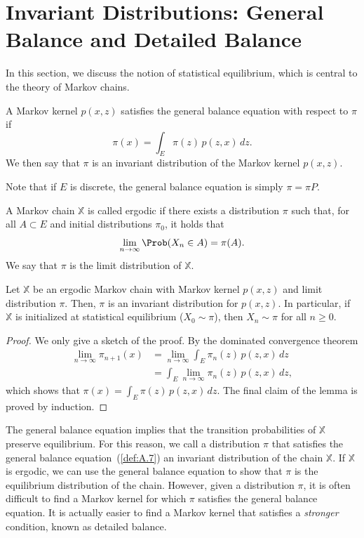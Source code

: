 \section{Invariant Distributions: General Balance and Detailed Balance}
\label{sec:A.2}

In this section, we discuss the notion of statistical equilibrium, which is central to the theory of
Markov chains.

\begin{definition}
\label{def:A.7}
A Markov kernel $p(x, z)$ satisfies the general balance equation with respect to $\pi$ if
\[
  \pi(x) = \int_E \pi(z)\, p(z, x)\, dz.
\]
We then say that $\pi$ is an invariant distribution of the Markov kernel $p(x, z)$.
\end{definition}

Note that if $E$ is discrete, the general balance equation is simply $\pi = \pi P$.

\begin{definition}
\label{def:A.8}
A Markov chain $\mathbb{X}$ is called ergodic if there exists a distribution $\pi$ such that, for
all $A \subset E$ and initial distributions $\pi_0$, it holds that
\[
  \lim_{n \to \infty} \Prob(X_n \in A) = \pi(A).
\]
We say that $\pi$ is the limit distribution of $\mathbb{X}$.
\end{definition}

\begin{lemma}
\label{lem:A.9}
Let $\mathbb{X}$ be an ergodic Markov chain with Markov kernel $p(x, z)$ and limit distribution
$\pi$.  Then, $\pi$ is an invariant distribution for $p(x, z)$.  In particular, if $\mathbb{X}$ is
initialized at statistical equilibrium ($X_0 \sim \pi$), then $X_n \sim \pi$ for all $n \geq 0$.
\end{lemma}

\begin{proof}
We only give a sketch of the proof.  By the dominated convergence theorem
\begin{align*}
  \lim_{n \to \infty} \pi_{n+1}(x)
    &= \lim_{n \to \infty} \int_E \pi_n(z)\, p(z, x)\, dz \\
    &= \int_E \lim_{n \to \infty} \pi_n(z)\, p(z, x)\, dz,
\end{align*}
which shows that $\pi(x) = \int_E \pi(z)\, p(z, x)\, dz$.  The final claim of the lemma is proved
by induction.
\end{proof}

The general balance equation implies that the transition probabilities of $\mathbb{X}$ preserve
equilibrium.  For this reason, we call a distribution $\pi$ that satisfies the general balance
equation~(\ref{def:A.7}) an invariant distribution of the chain $\mathbb{X}$.  If $\mathbb{X}$ is
ergodic, we can use the general balance equation to show that $\pi$ is the equilibrium distribution
of the chain.  However, given a distribution $\pi$, it is often difficult to find a Markov kernel
for which $\pi$ satisfies the general balance equation.  It is actually easier to find a Markov
kernel that satisfies a \emph{stronger} condition, known as detailed balance.


